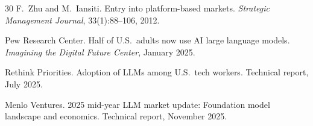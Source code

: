 \documentclass[10pt,twocolumn]{article}
\begin{document}
\begin{thebibliography}{30}
 F.~Zhu and M.~Iansiti. Entry into platform-based markets. {\em Strategic Management Journal}, 33(1):88--106, 2012.


 Pew Research Center. Half of U.S.\ adults now use {AI} large language models. {\em Imagining the Digital Future Center}, January 2025.

 Rethink Priorities. Adoption of {LLM}s among {U.S.}\ tech workers. Technical report, July 2025.

 Menlo Ventures. 2025 mid-year {LLM} market update: Foundation model landscape and economics. Technical report, November 2025.

\end{thebibliography}
\end{document}
